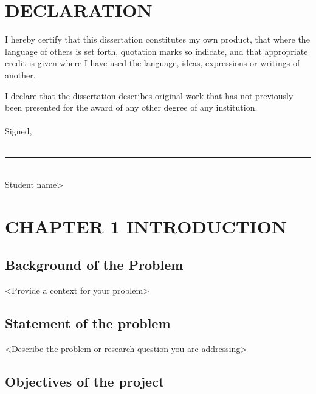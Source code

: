 \documentclass[12pt,openany]{book}
\begin{document}
\chapter*{DECLARATION}

I hereby certify that this dissertation constitutes my own product, that where the language of others is set forth, quotation marks so indicate, and that appropriate credit is given where I have used the language, ideas, expressions or writings of another.

I declare that the dissertation describes original work that has not previously been presented for the award of any other degree of any institution.\\
\quad\\

Signed,\\
\quad\\
\indent\rule{2.5in}{.5pt}\\
\indent{\textless}Student name{\textgreater}

\clearpage
\tableofcontents
{}

\clearpage
\listoftables
{}

\clearpage
\listoffigures
{}

\mainmatter

\chapter[INTRODUCTION]{\hfill CHAPTER 1 \hfill\null\vskip15pt INTRODUCTION}

\section[\small BACKGROUND OF THE PROBLEM]{Background of the Problem}

{\textless}Provide a context for your problem{\textgreater}

\section[\small STATEMENT OF THE PROBLEM]{Statement of the problem}

{\textless}Describe the problem or research question you are addressing{\textgreater}

\section[\small OBJECTIVES OF THE PROJECT]{Objectives of the project}
\end{document}
